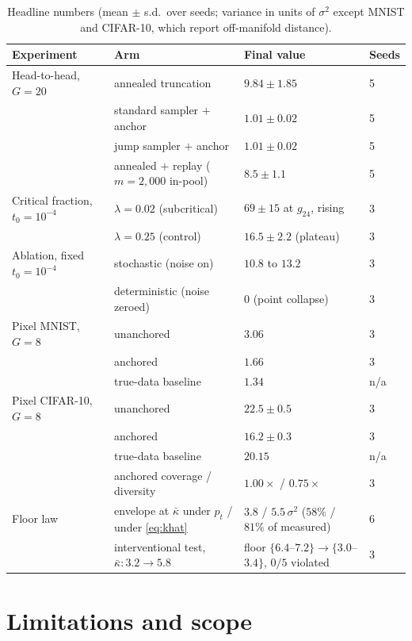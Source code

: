 \documentclass[11pt]{article}
\theoremstyle{remark}
\newcommand{\kb}{\bar\kappa}
\newcommand{\sigsq}{\sigma^2}
\begin{document}
\begin{table}[t]
\centering\small
\caption{Headline numbers (mean $\pm$ s.d.\ over seeds; variance in units of $\sigsq$
except MNIST and CIFAR-10, which report off-manifold distance).}
\label{tab:headline}
\begin{tabular}{llll}
\toprule
Experiment & Arm & Final value & Seeds \\
\midrule
Head-to-head, $G{=}20$ & annealed truncation \citep{khelifa2026recursive} & $9.84\pm1.85$ & 5 \\
 & standard sampler $+$ anchor & $1.01\pm0.02$ & 5 \\
 & jump sampler $+$ anchor & $1.01\pm0.02$ & 5 \\
 & annealed $+$ replay ($m{=}2{,}000$ in-pool) & $8.5\pm1.1$ & 5 \\
\midrule
Critical fraction, $t_0{=}10^{-4}$ & $\lambda=0.02$ (subcritical) & $69\pm15$ at $g_{24}$, rising & 3 \\
 & $\lambda=0.25$ (control) & $16.5\pm2.2$ (plateau) & 3 \\
\midrule
Ablation, fixed $t_0{=}10^{-4}$ & stochastic (noise on) & $10.8$ to $13.2$ & 3 \\
 & deterministic (noise zeroed) & $0$ (point collapse) & 3 \\
\midrule
Pixel MNIST, $G{=}8$ & unanchored & $3.06$ & 3 \\
 & anchored & $1.66$ & 3 \\
 & true-data baseline & $1.34$ & n/a \\
\midrule
Pixel CIFAR-10, $G{=}8$ & unanchored & $22.5\pm0.5$ & 3 \\
 & anchored & $16.2\pm0.3$ & 3 \\
 & true-data baseline & $20.15$ & n/a \\
 & anchored coverage / diversity & $1.00\times$ / $0.75\times$ & 3 \\
\midrule
Floor law & envelope at $\kb$ under $p_t$ / under \eqref{eq:khat} & $3.8$ / $5.5\,\sigsq$ ($58\%$ / $81\%$ of measured) & 6 \\
 & interventional test, $\kb\!:3.2\to5.8$ & floor $\{6.4$--$7.2\}\to\{3.0$--$3.4\}$, $0/5$ violated & 3 \\
\bottomrule
\end{tabular}
\end{table}

\section{Limitations and scope}\label{sec:limits}
\end{document}
